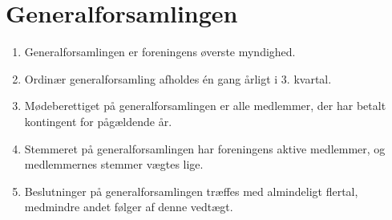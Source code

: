 \documentclass[a4paper, 10pt]{article}
\renewcommand\thesection{\textsection\arabic{section}}
\newenvironment{stykenum}{
  \begin{enumerate}[%
    label=Stk.~\arabic*:, ref=\thesection~Stk.~\arabic{enumi}, start=1]
}{\end{enumerate}}
\begin{document}
\section{Generalforsamlingen}
\begin{stykenum}
    \item Generalforsamlingen er foreningens øverste myndighed.

    \item Ordinær generalforsamling afholdes én gang årligt i 3. kvartal.

    \item Mødeberettiget på generalforsamlingen er alle medlemmer, der har
        betalt kontingent for pågældende år.

    \item Stemmeret på generalforsamlingen har foreningens aktive medlemmer, og
        medlemmernes stemmer vægtes lige.

    \item Beslutninger på generalforsamlingen træffes med almindeligt flertal,
        medmindre andet følger af denne vedtægt.
\end{stykenum}
\end{document}
